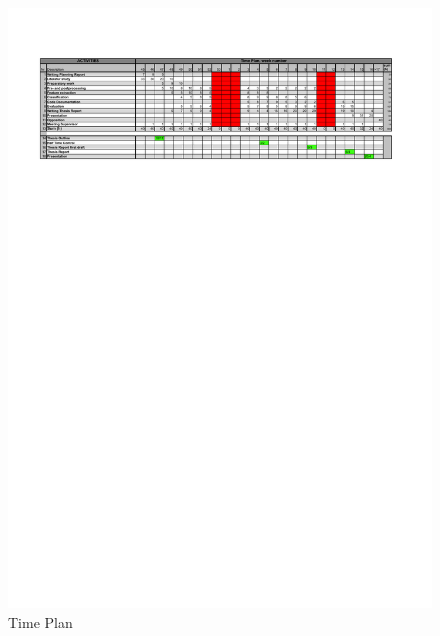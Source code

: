 \documentclass{article}
\begin{document}
\begin{figure}[h!]
    \centering
    \includegraphics[height=9 cm, width=18 cm, angle=90]{fig/Tidplan}
    \caption{Time Plan}
    \label{fig:timeplan}
\end{figure}

\newpage
\end{document}
